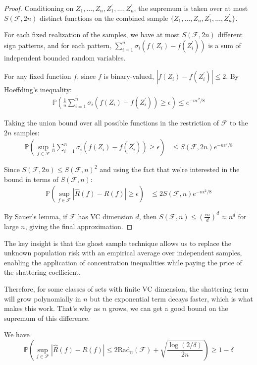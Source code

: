 \begin{proof}
    Conditioning on $Z_1, \ldots, Z_n, Z_1^{\prime}, \ldots, Z_n^{\prime}$, the supremum is taken over at most $S(\mathcal{F}, 2n)$ distinct functions on the combined sample $\{Z_1, \ldots, Z_n, Z_1^{\prime}, \ldots, Z_n^{\prime}\}$.
   
    For each fixed realization of the samples, we have at most $S(\mathcal{F}, 2n)$ different sign patterns, and for each pattern, $\sum_{i=1}^n \sigma_i (f(Z_i) - f(Z_i^{\prime}))$ is a sum of independent bounded random variables.
   
    For any fixed function $f$, since $f$ is binary-valued, $|f(Z_i) - f(Z_i^{\prime})| \leq 2$. By Hoeffding's inequality:
    \begin{align}
      \mathbb{P} \left( \frac{1}{n} \sum_{i=1}^n \sigma_i (f(Z_i) - f(Z_i^{\prime})) \geq \epsilon \right) \leq e^{-n\epsilon^2/8}
    \end{align}
   
    Taking the union bound over all possible functions in the restriction of $\mathcal{F}$ to the $2n$ samples:
    \begin{align}
      \mathbb{P} \left( \sup_{f \in \mathcal{F}} \frac{1}{n} \sum_{i=1}^n \sigma_i (f(Z_i) - f(Z_i^{\prime})) \geq \epsilon \right) &\leq S(\mathcal{F}, 2n) e^{-n\epsilon^2/8}
    \end{align}
   
    Since $S(\mathcal{F}, 2n) \leq S(\mathcal{F}, n)^2$ and using the fact that we're interested in the bound in terms of $S(\mathcal{F}, n)$:
    \begin{align}
      \mathbb{P} \left( \sup_{f \in \mathcal{F}} | \hat{R}(f) - R(f) | \geq \epsilon \right) &\leq 2 S(\mathcal{F}, n) e^{-n\epsilon^2/8}
    \end{align}
   
    By Sauer's lemma, if $\mathcal{F}$ has VC dimension $d$, then $S(\mathcal{F}, n) \leq \left(\frac{en}{d}\right)^d \approx n^d$ for large $n$, giving the final approximation.
  \end{proof}

  The key insight is that the ghost sample technique allows us to replace the unknown population risk with an empirical average over independent samples, enabling the application of concentration inequalities while paying the price of the shattering coefficient.

  Therefore, for some classes of sets with finite VC dimension, the shattering term will grow polynomially in $n$ but the exponential term decays faster, which is what makes this work. That's why as $n$ grows, we can get a good bound on the supremum of this difference. 

  \begin{theorem}
    We have 
    \begin{equation}
      \mathbb{P} \left( \sup_{f \in \mathcal{F}} |\hat{R} (f) - R(f)| \leq 2 \mathrm{Rad}_n (\mathcal{F}) + \sqrt{\frac{\log (2 / \delta)}{2 n}} \right) \geq 1 - \delta
    \end{equation}
  \end{theorem}

